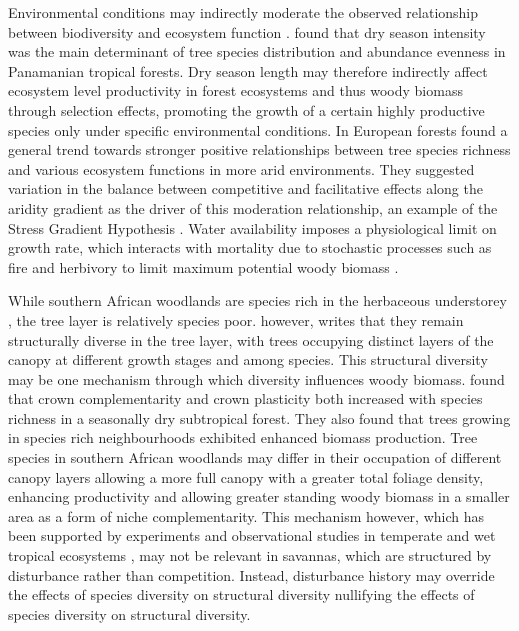 \documentclass[11pt,a4paper]{article}
\begin{document}
Environmental conditions may indirectly moderate the observed relationship between biodiversity and ecosystem function \citep{Vila2005}. \citet{Condit2013} found that dry season intensity was the main determinant of tree species distribution and abundance evenness in Panamanian tropical forests. Dry season length may therefore indirectly affect ecosystem level productivity in forest ecosystems and thus woody biomass through selection effects, promoting the growth of a certain highly productive species only under specific environmental conditions. In European forests \citep{Ratcliffe2017} found a general trend towards stronger positive relationships between tree species richness and various ecosystem functions in more arid environments. They suggested variation in the balance between competitive and facilitative effects along the aridity gradient as the driver of this moderation relationship, an example of the Stress Gradient Hypothesis \citep{Dohn2013}. Water availability imposes a physiological limit on growth rate, which interacts with mortality due to stochastic processes such as fire and herbivory to limit maximum potential woody biomass \citep{Sankaran2005}. 


While southern African woodlands are species rich in the herbaceous understorey \citep{Murphy2016}, the tree layer is relatively species poor. \citet{Solbrig1996} however, writes that they remain structurally diverse in the tree layer, with trees occupying distinct layers of the canopy at different growth stages and among species. This structural diversity may be one mechanism through which diversity influences woody biomass. \citep{Kunz2019} found that crown complementarity and crown plasticity both increased with species richness in a seasonally dry subtropical forest. They also found that trees growing in species rich neighbourhoods exhibited enhanced biomass production. Tree species in southern African woodlands may differ in their occupation of different canopy layers allowing a more full canopy with a greater total foliage density, enhancing productivity and allowing greater standing woody biomass in a smaller area as a form of niche complementarity. This mechanism however, which has been supported by experiments and observational studies in temperate and wet tropical ecosystems \citep{Hardiman2011, Stark2012}, may not be relevant in savannas, which are structured by disturbance rather than competition. Instead, disturbance history may override the effects of species diversity on structural diversity nullifying the effects of species diversity on structural diversity.
\end{document}
